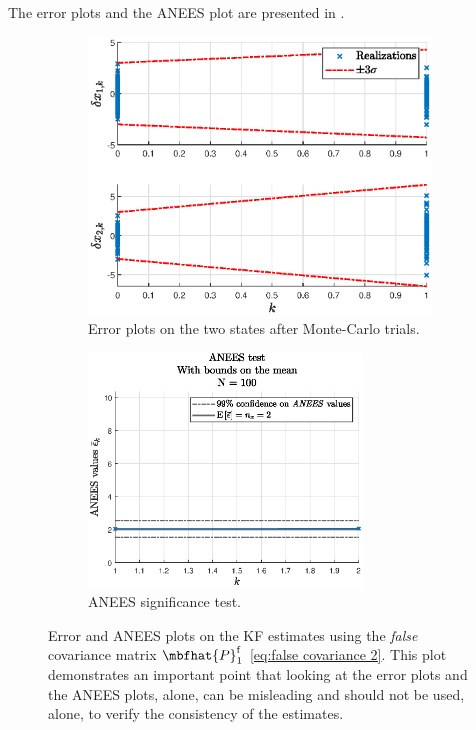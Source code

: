 \documentclass{simple-article}
\begin{document}
The error plots and the ANEES plot are presented in .

\begin{figure}[H]
  \centering
  \begin{subfigure}{0.45\textwidth}
    \includegraphics[width=\textwidth]{../figs/Phat_lmi/error_plots_N100_falseCovariance_scatter.eps}
    \caption{Error plots on the two states after Monte-Carlo trials.}
    \label{fig:error_plots_N100_falseCovariance_scatter 2}
  \end{subfigure}
  \begin{subfigure}{0.45\textwidth}
    \includegraphics[width=0.8\textwidth]{../figs/Phat_lmi/anees_N100_falseCovariance.eps}    
    \caption{ANEES significance test.}
    \label{fig:anees_N100_falseCovariance 2}
  \end{subfigure}
  \caption{Error and ANEES plots on the KF estimates using the \emph{false} covariance matrix $\mbfhat{P}_{1}^{\mathrm{f}}$ \eqref{eq:false covariance 2}. This plot demonstrates an important point that looking at the error plots and the ANEES plots, alone, can be misleading and should not be used, alone, to verify the consistency of the estimates.}
  \label{fig:false covariance plots 2}
\end{figure}
\printbibliography
\end{document}
